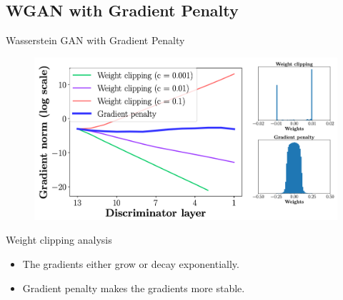\documentclass{beamer}
\begin{document}
\subsection{WGAN with Gradient Penalty}
\begin{frame}{Wasserstein GAN with Gradient Penalty}
	\vspace{-0.2cm}
	\begin{figure}
		\centering
		\includegraphics[width=0.9\linewidth]{figs/wgan_gp_weights}
	\end{figure}
	\vspace{-0.2cm} 
	
	\begin{block}{Weight clipping analysis}
		\begin{itemize}
			\item The gradients either grow or decay exponentially.
			\item Gradient penalty makes the gradients more stable.
		\end{itemize}
	\end{block}
\end{frame}
\end{document}
